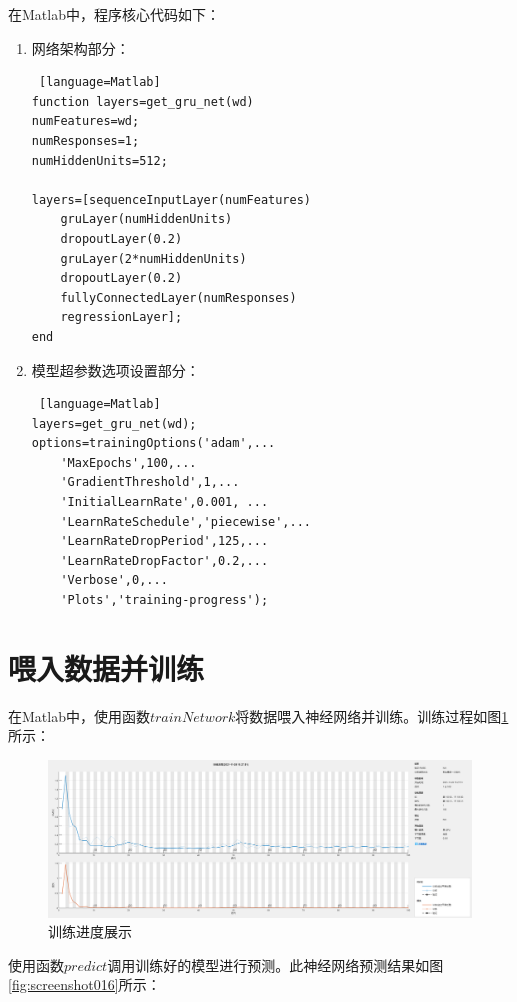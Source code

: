 \documentclass{jnuthesis}
\begin{document}
在Matlab中，程序核心代码如下：

\begin{enumerate}
	\item 网络架构部分：

\begin{lstlisting} [language=Matlab]
function layers=get_gru_net(wd)
numFeatures=wd;
numResponses=1;
numHiddenUnits=512;

layers=[sequenceInputLayer(numFeatures)
	gruLayer(numHiddenUnits)
	dropoutLayer(0.2)
	gruLayer(2*numHiddenUnits)
	dropoutLayer(0.2)
	fullyConnectedLayer(numResponses)
	regressionLayer];
end
\end{lstlisting}

\item 模型超参数选项设置部分：
\begin{lstlisting} [language=Matlab]
layers=get_gru_net(wd);
options=trainingOptions('adam',...
	'MaxEpochs',100,...
	'GradientThreshold',1,...
	'InitialLearnRate',0.001, ...
	'LearnRateSchedule','piecewise',...
	'LearnRateDropPeriod',125,...
	'LearnRateDropFactor',0.2,...
	'Verbose',0,...
	'Plots','training-progress');
\end{lstlisting}
\end{enumerate}



\section{喂入数据并训练}

在Matlab中，使用函数$ trainNetwork $将数据喂入神经网络并训练。训练过程如图\ref{fig:screenshot015}所示：

\begin{figure}[H]
	\centering
	\includegraphics[width=1\linewidth]{pic/screenshot015}
	\caption{训练进度展示}
	\label{fig:screenshot015}
\end{figure}

使用函数$ predict $调用训练好的模型进行预测。此神经网络预测结果如图\ref{fig:screenshot016}所示：
\end{document}
